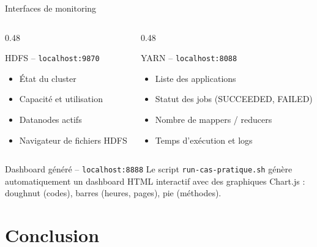 \documentclass[aspectratio=169, 11pt]{beamer}
\begin{document}
\begin{frame}{Interfaces de monitoring}
  \begin{columns}[T]
    \begin{column}{0.48\textwidth}
      \begin{block}{ HDFS -- \texttt{localhost:9870}}
        \begin{itemize}
          \item État du cluster
          \item Capacité et utilisation
          \item Datanodes actifs
          \item Navigateur de fichiers HDFS
        \end{itemize}
      \end{block}
    \end{column}
    \begin{column}{0.48\textwidth}
      \begin{block}{ YARN -- \texttt{localhost:8088}}
        \begin{itemize}
          \item Liste des applications
          \item Statut des jobs (SUCCEEDED, FAILED)
          \item Nombre de mappers / reducers
          \item Temps d'exécution et logs
        \end{itemize}
      \end{block}
    \end{column}
  \end{columns}

  \vspace{1em}

  \begin{exampleblock}{ Dashboard généré -- \texttt{localhost:8888}}
    Le script \texttt{run-cas-pratique.sh} génère automatiquement un dashboard HTML interactif
    avec des graphiques Chart.js : doughnut (codes), barres (heures, pages), pie (méthodes).
  \end{exampleblock}
\end{frame}

\section{Conclusion}
\end{document}
